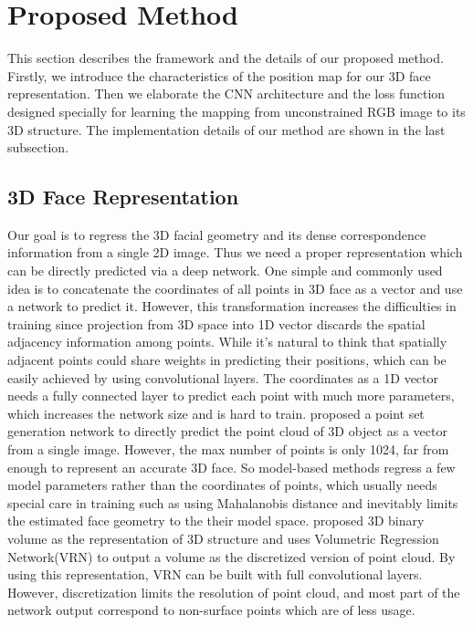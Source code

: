 \documentclass[runningheads]{llncs}
\begin{document}
\section{Proposed Method}
This section describes the framework and the details of our proposed method. Firstly, we introduce the characteristics of the position map for our 3D face representation. Then we elaborate 
the CNN architecture and the loss function designed specially for learning the mapping from unconstrained RGB image to its 3D structure. The implementation details of our method are shown in the last subsection.

\subsection{3D Face Representation}
\label{sec: representation}
Our goal is to regress the 3D facial geometry and its dense correspondence information from a single 2D image. Thus we need a proper representation which can be directly predicted via a deep network.
One simple and commonly used idea is to concatenate the coordinates of all points in 3D face as a vector and use a network to predict it. However, this transformation increases the difficulties in training since projection from 3D space into 1D vector discards the spatial adjacency information among points. 
While it's natural to think that spatially adjacent points could share weights in predicting their positions, which can be easily achieved by using convolutional layers. The coordinates as a 1D vector needs a fully connected layer to predict each point with much more parameters, which increases the network size and is hard to train.
\cite{Fan2016A} proposed a point set generation network to directly predict the point cloud of 3D object as a vector from a single image. However, the max number of points is only 1024, far from enough to represent an accurate 3D face. 
So model-based methods\cite{zhu2016face,Dou2017End,liu2017dense} regress a few model parameters rather than the coordinates of points, which usually needs special care in training such as using Mahalanobis distance and inevitably limits the estimated face geometry to the their model space.   
\cite{Jackson2017Large} proposed 3D binary volume as the representation of 3D structure and uses Volumetric Regression Network(VRN) to output a  volume as the discretized version of point cloud. By using this representation, VRN can be built with full convolutional layers. However, discretization limits the resolution of point cloud, and most part of the network output correspond to non-surface points which are of less usage.
\end{document}

